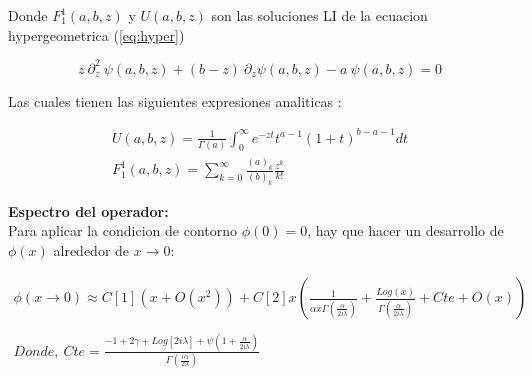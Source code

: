 Donde $F _1 ^1(a,b,z)$ y $ U(a,b,z)$ son las soluciones LI de la ecuacion hypergeometrica (\ref{eq:hyper})

\begin{equation}
    z \ \partial ^2 _z \ \psi (a,b,z) + (b-z) \
    \partial _z \psi (a,b,z)
    -a \ \psi (a,b,z) = 0
\label{eq:hyper}
\end{equation}

Las cuales tienen las siguientes expresiones analiticas  : 

\begin{equation}
\begin{array}{c}
	U(a,b,z) = \frac{1}{\Gamma (a)} 
	\int _0 ^{\infty} e ^{-zt}
	t ^{a-1}
	(1+t) ^{b-a-1}
	dt \\
	F _1 ^1 (a,b,z) = \sum _ {k=0} ^{\infty} 
	\frac{(a) _k}{(b) _k} 
	\frac{z ^k}{k!} 
\end{array}
\end{equation}






\textbf{Espectro del operador:} \\


Para aplicar la condicion de contorno $\phi (0) = 0$, hay que hacer un desarrollo de $\phi(x)$  alrededor de $x \rightarrow 0$:

\begin{equation}
\begin{array}{c}
\phi (x \rightarrow 0) \approx
C[1] ( x + O(x ^2)) + 
C[2] x 
\left( 
\frac{1}{  \alpha x  \Gamma ( \frac{ \alpha}{2 i \lambda}  )   }  +
\frac{Log(x) }{\Gamma ( \frac{ \alpha}{2 i \lambda} ) } + Cte + O(x)
\right)
\\ \\
Donde,  \ Cte = 
\frac{
-1 + 2 \gamma + Log[2 i \lambda] + \psi (1 + \frac{ \alpha}{2 i \lambda})
}
{\Gamma (\frac{i \alpha}{2 \lambda})}
\end{array}
\label{eq.scat}
\end{equation}

